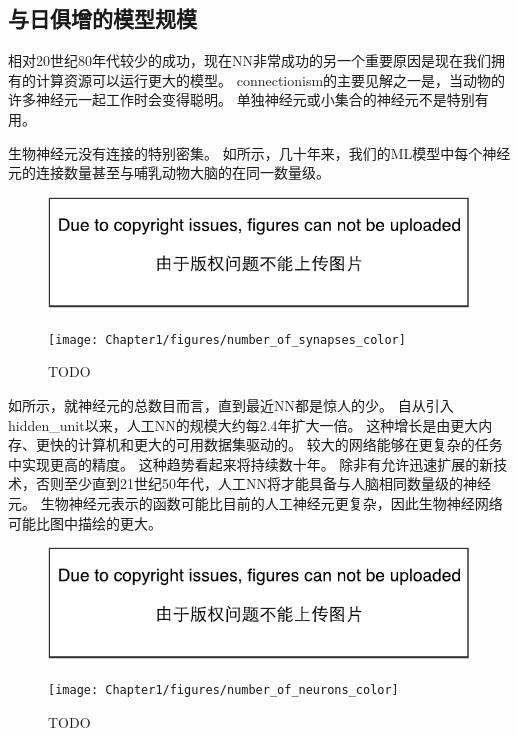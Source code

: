 
\subsection{与日俱增的模型规模}
\label{sec:increasing_model_sizes}

相对20世纪80年代较少的成功，现在\gls{NN}非常成功的另一个重要原因是现在我们拥有的计算资源可以运行更大的模型。
\gls{connectionism}的主要见解之一是，当动物的许多神经元一起工作时会变得聪明。
单独神经元或小集合的神经元不是特别有用。

生物神经元没有连接的特别密集。
如所示，几十年来，我们的\gls{ML}模型中每个神经元的连接数量甚至与哺乳动物大脑的在同一数量级。
\begin{figure}[!htb]
\ifOpenSource
\centerline{\includegraphics{figure.pdf}}
\else
\centerline{\texttt{[image: Chapter1/figures/number\_of\_synapses\_color]}}
\fi
\caption{TODO}
\label{fig:chap1_number_of_synapses_color}
\end{figure}

如所示，就神经元的总数目而言，直到最近\gls{NN}都是惊人的少。
自从引入\gls{hidden_unit}以来，人工\gls{NN}的规模大约每2.4年扩大一倍。
这种增长是由更大内存、更快的计算机和更大的可用数据集驱动的。
较大的网络能够在更复杂的任务中实现更高的精度。
这种趋势看起来将持续数十年。
除非有允许迅速扩展的新技术，否则至少直到21世纪50年代，人工\gls{NN}将才能具备与人脑相同数量级的神经元。
生物神经元表示的函数可能比目前的人工神经元更复杂，因此生物神经网络可能比图中描绘的更大。
\begin{figure}[!htb]
\ifOpenSource
\centerline{\includegraphics{figure.pdf}}
\else
\centerline{\texttt{[image: Chapter1/figures/number\_of\_neurons\_color]}}
\fi
\caption{TODO}
\label{fig:chap1_number_of_neurons_color}
\end{figure}


